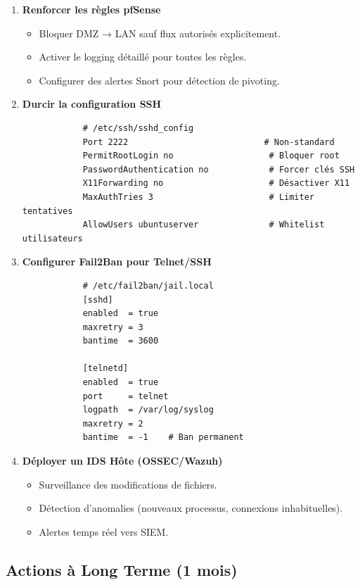 \documentclass[12pt,a4paper,openany]{report}
\begin{document}
	\begin{enumerate}
		\item \textbf{Renforcer les règles pfSense}
		\begin{itemize}
			\item Bloquer DMZ → LAN sauf flux autorisés explicitement.
			\item Activer le logging détaillé pour toutes les règles.
			\item Configurer des alertes Snort pour détection de pivoting.
		\end{itemize}
		
		\item \textbf{Durcir la configuration SSH}
		\begin{lstlisting}
			# /etc/ssh/sshd_config
			Port 2222                           # Non-standard
			PermitRootLogin no                   # Bloquer root
			PasswordAuthentication no            # Forcer clés SSH
			X11Forwarding no                     # Désactiver X11
			MaxAuthTries 3                       # Limiter tentatives
			AllowUsers ubuntuserver              # Whitelist utilisateurs
		\end{lstlisting}
		
		\item \textbf{Configurer Fail2Ban pour Telnet/SSH}
		\begin{lstlisting}
			# /etc/fail2ban/jail.local
			[sshd]
			enabled  = true
			maxretry = 3
			bantime  = 3600
			
			[telnetd]
			enabled  = true
			port     = telnet
			logpath  = /var/log/syslog
			maxretry = 2
			bantime  = -1    # Ban permanent
		\end{lstlisting}
		
		\item \textbf{Déployer un IDS Hôte (OSSEC/Wazuh)}
		\begin{itemize}
			\item Surveillance des modifications de fichiers.
			\item Détection d'anomalies (nouveaux processus, connexions inhabituelles).
			\item Alertes temps réel vers SIEM.
		\end{itemize}
	\end{enumerate}
	
	\subsection{Actions à Long Terme (1 mois)}
	
\end{document}
